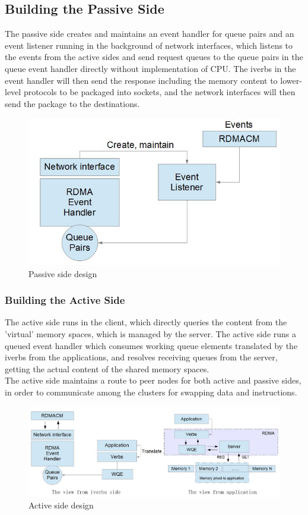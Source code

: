 \documentclass[11pt,openright,a4paper]{report}
\begin{document}
\subsection{Building the Passive Side}
The passive side creates and maintains an event handler for queue pairs and an event listener running in the background of network interfaces, which listens to the events from the active sides and send request queues to the queue pairs in the queue event handler directly without implementation of CPU\cite{kashyap2006queue}. The iverbs in the event handler will then send the response including the memory content to lower-level protocols to be packaged into sockets, and the network interfaces will then send the package to the destinations.\\
\begin{figure}[H]
	\centering
    \includegraphics[width=0.5\linewidth]{picture/passive.JPG}
    \caption{Passive side design}
    \label{fig:passive}
\end{figure}
\subsubsection{Building the Active Side}
The active side runs in the client, which directly queries the content from the 'virtual' memory spaces, which is managed by the server. The active side runs a queued event handler which consumes working queue elements translated by the iverbs from the applications, and resolves receiving queues from the server, getting the actual content of the shared memory spaces\cite{kashyap2006queue}.\\
The active side maintains a route to peer nodes for both active and passive sides, in order to communicate among the clusters for swapping data and instructions.\\
\begin{figure}[H]
	\centering
    \includegraphics[width=0.8\linewidth]{picture/active.JPG}
    \caption{Active side design}
    \label{fig:active}
\end{figure}
\end{document}
